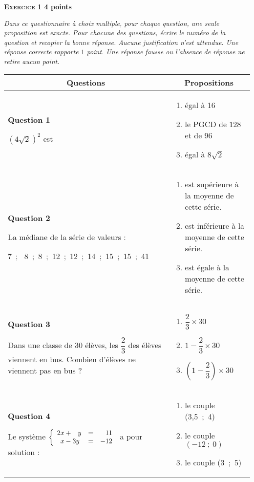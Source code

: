 \textbf{\textsc{Exercice 1} \hfill 4 points}

\medskip

\emph{Dans ce questionnaire à choix multiple, pour chaque question, une seule proposition
est exacte. Pour chacune des questions, écrire le numéro de la question et recopier
la bonne réponse. Aucune justification n'est attendue. Une réponse correcte rapporte
$1$ point. Une réponse fausse ou l'absence de réponse ne retire aucun point.}

\medskip
\begin{tabularx}{\linewidth}{|X|X|}\hline
\multicolumn{1}{|c|}{Questions}&\multicolumn{1}{|c|}{Propositions}\\ \hline
\textbf{Question 1}

$\left(4\sqrt{2}\right)^2$ est&
\begin{enumerate}
\item égal à 16
\item  le PGCD de $128$ et de $96$
\item égal à $8\sqrt{2}$
\end{enumerate}\\ \hline
\textbf{Question 2}

La médiane de la série de valeurs :

7~;~ 8~;~8~;~12~;~12~;~14~;~15~;~15~;~41&
\begin{enumerate}
\item est supérieure à la moyenne de cette série.
\item est inférieure à la moyenne de cette série.
\item est égale à la moyenne de cette série.
\end{enumerate}\\ \hline
\textbf{Question 3}

Dans une classe de 30 élèves, les $\dfrac{2}{3}$ des élèves
viennent en bus. Combien d'élèves ne viennent pas en bus ?&
\begin{enumerate}
\item $\dfrac{2}{3} \times  30$
\item $1 - \dfrac{2}{3} \times 30$
\item $\left(1 - \dfrac{2}{3}\right) \times 30$
\end{enumerate}\\ \hline
\textbf{Question 4}

Le système $\left\{\begin{array}{l c r}
2x+ \phantom{-}y	&=&11\\
\phantom{2}x - 3y 	&=&- 12
\end{array}\right.$ a pour solution :&
\begin{enumerate}
\item le couple (3,5~;~4)
\item le couple $(- 12~;~0)$
\item le couple (3~;~5)
\end{enumerate}\\ \hline
\end{tabularx}
\medskip

\vspace{0.25cm}

